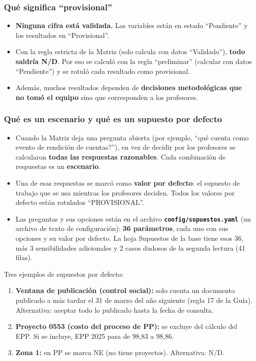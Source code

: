 \documentclass[11pt,letterpaper]{article}
\begin{document}
\subsubsection*{Qué significa ``provisional''}

\begin{itemize}
\item \textbf{Ninguna cifra está validada.} Las variables están en estado ``Pendiente'' y los resultados en ``Provisional''.
\item Con la regla estricta de la Matriz (solo calcula con datos ``Validado''), \textbf{todo saldría N/D}. Por eso se calculó con la regla ``preliminar'' (calcular con datos ``Pendiente'') y se rotuló cada resultado como provisional.
\item Además, muchos resultados dependen de \textbf{decisiones metodológicas que no tomó el equipo} sino que corresponden a los profesores.
\end{itemize}

\subsubsection*{Qué es un escenario y qué es un supuesto por defecto}

\begin{itemize}
\item Cuando la Matriz deja una pregunta abierta (por ejemplo, ``\textquestiondown{}qué cuenta como evento de rendición de cuentas?''), en vez de decidir por los profesores se calcularon \textbf{todas las respuestas razonables}. Cada combinación de respuestas es un \textbf{escenario}.
\item Una de esas respuestas se marcó como \textbf{valor por defecto}: el supuesto de trabajo que se usa mientras los profesores deciden. Todos los valores por defecto están rotulados ``PROVISIONAL''.
\item Las preguntas y sus opciones están en el archivo \textbf{\texttt{\footnotesize config/\allowbreak{}supuestos.\allowbreak{}yaml}} (un archivo de texto de configuración): \textbf{36 parámetros}, cada uno con sus opciones y su valor por defecto. La hoja Supuestos de la base tiene esos 36, más 3 sensibilidades adicionales y 2 casos dudosos de la segunda lectura (41 filas).
\end{itemize}

Tres ejemplos de supuestos por defecto:

\begin{enumerate}
\item \textbf{Ventana de publicación (control social):} solo cuenta un documento publicado a más tardar el 31 de marzo del año siguiente (regla 17 de la Guía). Alternativa: aceptar todo lo publicado hasta la fecha de consulta.
\item \textbf{Proyecto 0553 (costo del proceso de PP):} se excluye del cálculo del EPP. Si se incluye, EPP 2025 pasa de 98,83 a 98,86.
\item \textbf{Zona 1:} en PP se marca NE (no tiene proyectos). Alternativa: N/D.
\end{enumerate}
\end{document}
